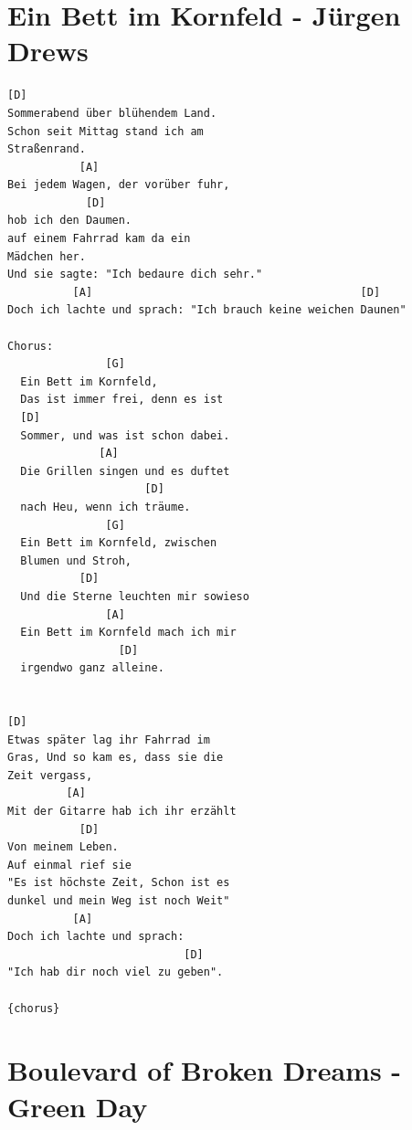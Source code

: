 \documentclass[
]{book}
\let\stdsection\section
\renewcommand\section{\clearpage\stdsection}
\begin{document}
\hypertarget{classics-ein-bett-im-kornfeld}{%
\section{Ein Bett im Kornfeld - Jürgen Drews}\label{classics-ein-bett-im-kornfeld}}

\begin{verbatim}
[D]
Sommerabend über blühendem Land.
Schon seit Mittag stand ich am 
Straßenrand.
           [A]
Bei jedem Wagen, der vorüber fuhr,
            [D]
hob ich den Daumen.
auf einem Fahrrad kam da ein 
Mädchen her.
Und sie sagte: "Ich bedaure dich sehr."
          [A]                                         [D]
Doch ich lachte und sprach: "Ich brauch keine weichen Daunen"

Chorus:
               [G]
  Ein Bett im Kornfeld,
  Das ist immer frei, denn es ist
  [D]
  Sommer, und was ist schon dabei.
              [A]
  Die Grillen singen und es duftet 
                     [D]
  nach Heu, wenn ich träume.
               [G]
  Ein Bett im Kornfeld, zwischen 
  Blumen und Stroh,
           [D]
  Und die Sterne leuchten mir sowieso
               [A]
  Ein Bett im Kornfeld mach ich mir 
                 [D]
  irgendwo ganz alleine.
  

[D]
Etwas später lag ihr Fahrrad im 
Gras, Und so kam es, dass sie die 
Zeit vergass,
         [A]
Mit der Gitarre hab ich ihr erzählt
           [D]
Von meinem Leben.
Auf einmal rief sie
"Es ist höchste Zeit, Schon ist es 
dunkel und mein Weg ist noch Weit"
          [A]
Doch ich lachte und sprach:
                           [D]
"Ich hab dir noch viel zu geben".

{chorus}

\end{verbatim}

\hypertarget{classics-boulevard-of-broken-dreams}{%
\section{Boulevard of Broken Dreams - Green Day}\label{classics-boulevard-of-broken-dreams}}
\end{document}
